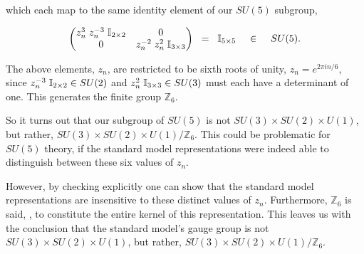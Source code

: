 \documentclass[letterpaper,12pt,titlepage,oneside,final]{book}
\begin{document}
\noindent which each map to the same identity element of our $SU(5)$ subgroup,  


\begin{equation}
\left( \begin{matrix}     
z_n^3\hspace{1mm}  z_n^{-3}\hspace{1mm}\mathbb{I}_{2\times 2}     &0\\0&z_n^{-2}\hspace{1mm} z_n^{2}\hspace{1mm}\mathbb{I}_{3\times 3}
\end{matrix}  
\right)  \hspace{2mm} 
= \hspace{2mm}  {\mathbb{I}}_{5\times 5} \hspace{4mm} \in \hspace{4mm} SU(5).
\end{equation}


The above elements, $z_n$, are restricted to be sixth roots  of unity, $z_n=e^{2\pi i n/6}$,   since $z_n^{-3}\hspace{1mm}\mathbb{I}_{2\times2}\in SU(2)$ and $z_n^{2}\hspace{1mm}\mathbb{I}_{3\times3}\in SU(3)$ must each have a determinant of one.  This generates the finite group $\mathbb{Z}_6$.

So it turns out that our subgroup of $SU(5)$ is not $SU(3)\times SU(2) \times U(1)$, but rather,  $SU(3)\times SU(2) \times U(1)/\mathbb{Z}_6$.  This could be problematic for $SU(5)$ theory, if the standard model representations were indeed able to distinguish between these six values of $z_n$.  

However, by checking explicitly one can show that the standard model representations are insensitive to these distinct values of $z_n$.  Furthermore, $\mathbb{Z}_6$ is said, \cite{agut}, to constitute the entire kernel of this representation.   This leaves us with the conclusion that the standard model's gauge group is not $SU(3)\times SU(2) \times U(1)$, but rather,  $SU(3)\times SU(2) \times U(1)/\mathbb{Z}_6$.






\end{document}
